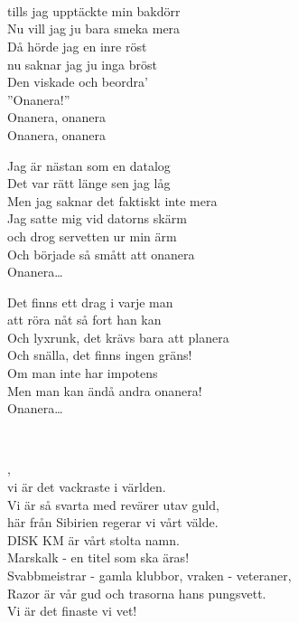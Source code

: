 \\

\newpage

 \\       
\author{Text: Sober}

\\
tills jag upptäckte min bakdörr\\
Nu vill jag ju bara smeka mera\\
Då hörde jag en inre röst\\
nu saknar jag ju inga bröst\\
Den viskade och beordra’ \\
”Onanera!” \\
Onanera, onanera\\
Onanera, onanera

Jag är nästan som en datalog\\
Det var rätt länge sen jag låg\\
Men jag saknar det faktiskt inte mera\\
Jag satte mig vid datorns skärm\\
och drog servetten ur min ärm\\
Och började så smått att onanera\\
Onanera…

Det finns ett drag i varje man\\
att röra nåt så fort han kan\\
Och lyxrunk, det krävs bara att planera\\
Och snälla, det finns ingen gräns!\\
Om man inte har impotens\\
Men man kan ändå andra onanera!\\
Onanera…



 \\       
\author{Text: Ida Wellner}

,\\
vi är det vackraste i världen.\\
Vi är så svarta med revärer utav guld,\\
här från Sibirien regerar vi vårt välde.\\
DISK KM är vårt stolta namn.\\
Marskalk - en titel som ska äras!\\
Svabbmeistrar - gamla klubbor, vraken - veteraner,\\
Razor är vår gud och trasorna hans pungsvett.\\
Vi är det finaste vi vet!

